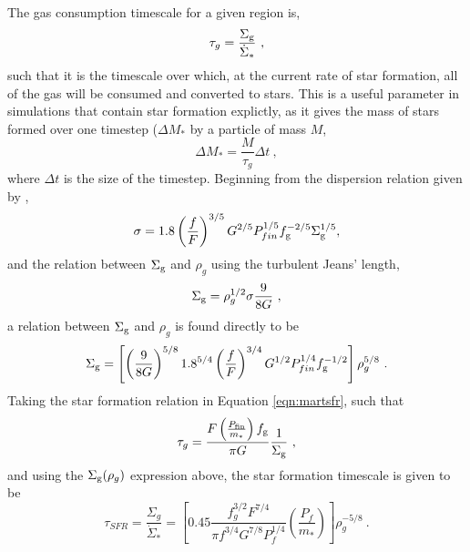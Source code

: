 The gas consumption timescale for a given region is,
\begin{equation}
\label{eqn:gcdef}
\tau_g = \frac{\Sigma_\mathrm{g}}{\dot{\Sigma}_*}~,
\end{equation}
such that it is the timescale over which, at the current rate of star formation, all of the gas will be consumed and converted to stars.
This is a useful parameter in simulations that contain star formation explictly, as it gives the mass of stars formed over one timestep ($\Delta M_*$ by a particle of mass $M$,
$$
\Delta M_* = \frac{M}{\tau_g} \Delta t~,
$$
where $\Delta t$ is the size of the timestep. Beginning from the dispersion relation given by \citet{martizzi_supernova_2015},
$$
\sigma = 1.8 \left(\frac{f}{F}\right)^{{3/5}} G^{{2/5}} P_{fin}^{{1/5}} f_\mathrm{g}^{{-2/5}} \Sigma_\mathrm{g}^{{1/5}},
$$
and the relation between $\Sigma_\mathrm{g}$ and $\rho_g$ using the turbulent Jeans' length,
$$
\Sigma_\mathrm{g} = \rho_g^{1/2} \sigma \frac{9}{8G}~,
$$
a relation between $\Sigma_\mathrm{g}$ and $\rho_g$ is found directly to be
\begin{equation}
\label{eqn:sgrhog}
\Sigma_\mathrm{g} = \left[\left(\frac{9}{8G}\right)^{5/8} 1.8^{5/4} \left(\frac{f}{F}\right)^{3/4} G^{1/2} P_{fin}^{1/4} f_\mathrm{g}^{-1/2}\right] \rho_g^{5/8} ~.
\end{equation}
Taking the star formation relation in Equation \ref{eqn:martsfr}, such that
$$
\tau_g = \frac{F\left(\frac{P_\mathrm{fin}}{m_*}\right)f_\mathrm{g}}{\pi G} \frac{1}{\Sigma_\mathrm{g}}~,
$$
and using the $\Sigma_\mathrm{g} ( \rho_g )$ expression above, the star formation timescale is given to be
\begin{equation}
\label{eqn:gc}
\tau_{SFR} = \frac{\Sigma_g}{\dot{\Sigma}_*} = \left[0.45 \frac{f_g^{3/2} F^{7/4}}{\pi f^{3/4} G^{7/8} P_f^{1/4}} \left(\frac{P_{f}}{m_*}\right)\right] \rho_g^{-5/8}~.
\end{equation}



